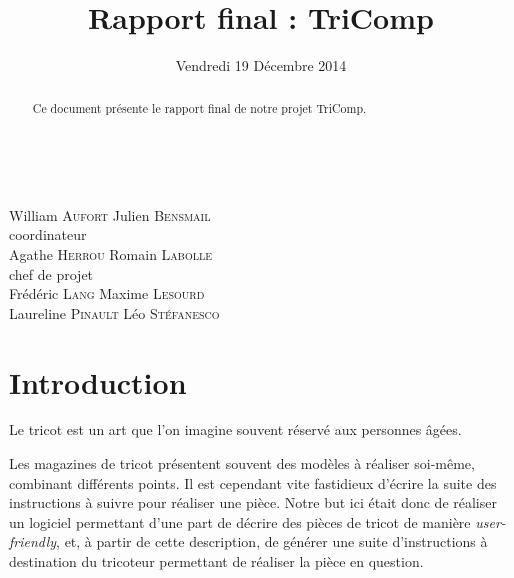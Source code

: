 \documentclass{article}
\title{Rapport final : TriComp}
\author{}
\date{Vendredi 19 Décembre 2014}
\begin{document}

\makeatletter %
  \begin{titlepage}
    \begin{center}
       {\LARGE \@title} \\
       \vspace{2cm} {\large \@date}
       \vspace{3cm}
    \end{center}
       {\large {William \textsc{Aufort} \hfill Julien
           \textsc{Bensmail} \\}
    \vspace{1cm} {\hfill coordinateur \\} {Agathe \textsc{Herrou}
      \hfill Romain \textsc{Labolle} \\}
       \vspace{1cm} {chef de projet \\}
       \vspace{1.5cm} {Frédéric \textsc{Lang} \hfill Maxime
         \textsc{Lesourd} \\} {Laureline \textsc{Pinault} \hfill Léo
         \textsc{Stéfanesco} \\}}
       \vspace{2.5cm}
    \begin{abstract}
	Ce document présente le rapport final de notre projet TriComp.
    \end{abstract}
  \end{titlepage}
\makeatother

\newpage

\tableofcontents

\newpage

\section*{Introduction}

Le tricot est un art que l'on imagine souvent réservé aux personnes
âgées.

Les magazines de tricot présentent souvent des modèles à réaliser
soi-même, combinant différents points. Il est cependant vite
fastidieux d'écrire la suite des instructions à suivre pour réaliser
une pièce. Notre but ici était donc de réaliser un logiciel permettant
d'une part de décrire des pièces de tricot de manière
\emph{user-friendly}, et, à partir de cette description, de générer
une suite d'instructions à destination du tricoteur permettant de
réaliser la pièce en question.
\end{document}
